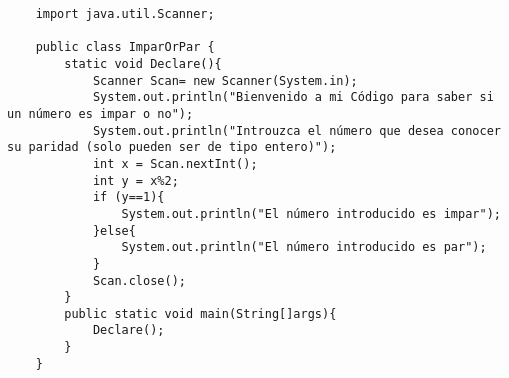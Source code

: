 \documentclass[12pt]{article}
\begin{document}
\begin{verbatim}
	import java.util.Scanner;
	
	public class ImparOrPar {
		static void Declare(){
			Scanner Scan= new Scanner(System.in);
			System.out.println("Bienvenido a mi Código para saber si un número es impar o no");
			System.out.println("Introuzca el número que desea conocer su paridad (solo pueden ser de tipo entero)");
			int x = Scan.nextInt();
			int y = x%2;
			if (y==1){
				System.out.println("El número introducido es impar");
			}else{
				System.out.println("El número introducido es par");
			}
			Scan.close();
		}
		public static void main(String[]args){
			Declare();
		}
	}
	
\end{verbatim}
\end{document}
